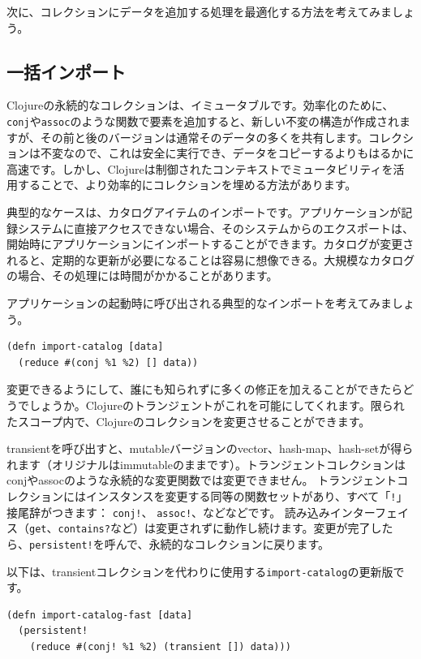 次に、コレクションにデータを追加する処理を最適化する方法を考えてみましょう。


\subsection{一括インポート}

Clojureの永続的なコレクションは、イミュータブルです。効率化のために、\texttt{conj}や\texttt{assoc}のような関数で要素を追加すると、新しい不変の構造が作成されますが、その前と後のバージョンは通常そのデータの多くを共有します。コレクションは不変なので、これは安全に実行でき、データをコピーするよりもはるかに高速です。しかし、Clojureは制御されたコンテキストでミュータビリティを活用することで、より効率的にコレクションを埋める方法があります。

典型的なケースは、カタログアイテムのインポートです。アプリケーションが記録システムに直接アクセスできない場合、そのシステムからのエクスポートは、開始時にアプリケーションにインポートすることができます。カタログが変更されると、定期的な更新が必要になることは容易に想像できる。大規模なカタログの場合、その処理には時間がかかることがあります。

アプリケーションの起動時に呼び出される典型的なインポートを考えてみましょう。


\begin{lstlisting}[numbers=none]
(defn import-catalog [data]
  (reduce #(conj %1 %2) [] data))
\end{lstlisting}

変更できるようにして、誰にも知られずに多くの修正を加えることができたらどうでしょうか。Clojureのトランジェントがこれを可能にしてくれます。限られたスコープ内で、Clojureのコレクションを変更させることができます。

transientを呼び出すと、mutableバージョンのvector、hash-map、hash-setが得られます（オリジナルはimmutableのままです）。トランジェントコレクションはconjやassocのような永続的な変更関数では変更できません。 トランジェントコレクションにはインスタンスを変更する同等の関数セットがあり、すべて「\texttt{!}」接尾辞がつきます： \texttt{conj!}、 \texttt{assoc!}、などなどです。 読み込みインターフェイス（\texttt{get}、\texttt{contains?}など）は変更されずに動作し続けます。変更が完了したら、\texttt{persistent!}を呼んで、永続的なコレクションに戻ります。

以下は、transientコレクションを代わりに使用する\texttt{import-catalog}の更新版です。

\begin{lstlisting}[numbers=none]
(defn import-catalog-fast [data]
  (persistent!
    (reduce #(conj! %1 %2) (transient []) data)))
\end{lstlisting}

